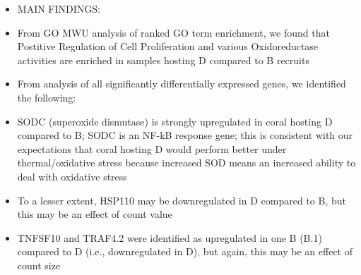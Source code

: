 \documentclass[
]{article}
\providecommand{\tightlist}{%
  \setlength{\itemsep}{0pt}\setlength{\parskip}{0pt}}
\begin{document}
\begin{itemize}
\tightlist
\item
  MAIN FINDINGS:
\item
  From GO MWU analysis of ranked GO term enrichment, we found that
  Postitive Regulation of Cell Proliferation and various Oxidoreductase
  activities are enriched in samples hosting D compared to B recruits
\item
  From analysis of all significantly differentially expressed genes, we
  identified the following:
\item
  SODC (superoxide dismutase) is strongly upregulated in coral hosting D
  compared to B; SODC is an NF-kB response gene; this is consistent with
  our expectations that coral hosting D would perform better under
  thermal/oxidative stress because increased SOD means an increased
  ability to deal with oxidative stress
\item
  To a lesser extent, HSP110 may be downregulated in D compared to B,
  but this may be an effect of count value
\item
  TNFSF10 and TRAF4.2 were identified as upregulated in one B (B.1)
  compared to D (i.e., downregulated in D), but again, this may be an
  effect of count size
\end{itemize}
\end{document}

